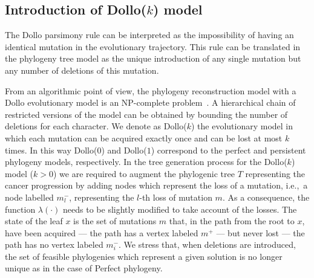 \documentclass[a4paper,USenglish]{article}
\newcommand{\ie}{i.e.,~}
\theoremstyle{definition}
\begin{document}
\subsection{Introduction of Dollo($k$) model}
\label{sec:intro_dollok}
The Dollo parsimony rule can be interpreted as the impossibility of 
having an identical mutation in the
evolutionary trajectory.
This rule can be translated in the phylogeny tree model as the unique introduction of 
any single mutation but any number of deletions of this mutation. 

From an algorithmic point of view,
the phylogeny reconstruction model 
with a Dollo evolutionary model is 
an NP-complete problem~\cite{BKW95,DAY198633}.
A hierarchical chain of restricted versions of the model can be obtained by bounding the number of deletions for each character.
We denote as Dollo($k$) the evolutionary model in which each mutation can be acquired exactly once and can be lost at most $k$ times. 
In this way Dollo($0$) and Dollo($1$) correspond to the perfect and persistent phylogeny models, respectively.
In the tree generation process for the Dollo($k$) model ($k>0$) we are required to augment
the phylogenic tree $T$ representing the cancer progression by adding nodes which
represent the loss of a mutation, \ie a node labelled $m^-_l$, representing the $l$-th
loss of mutation $m$.  
As a consequence, the function $\lambda(\cdot)$ needs to be slightly modified to take
account of the losses.
The state of the leaf $x$ is  the set of  mutations $m$ that, in the path from the root to
$x$, have been acquired --- the path has a vertex labeled $m^{+}$ --- but never lost ---
the path has no vertex labeled $m_{i}^{-}$.
We stress  that, when deletions are introduced, 
the set of feasible phylogenies which represent a given solution is no longer unique as in
the case of Perfect phylogeny.
\end{document}
